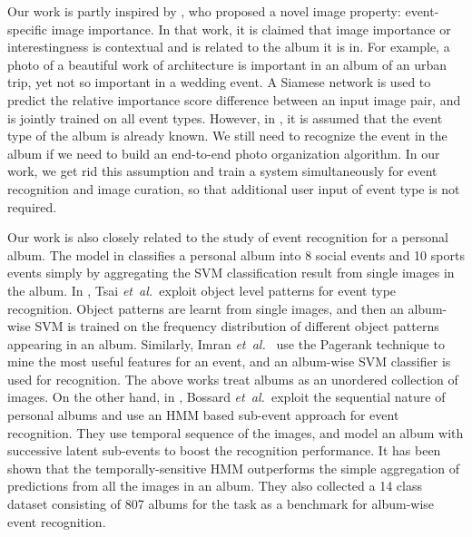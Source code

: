 \documentclass[runningheads]{llncs}
\newcommand{\etal}{\mbox{\emph{et al.\ }}}
\begin{document}
Our work is partly inspired by \cite{CVPR}, who proposed a novel image property: event-specific image importance. In that work, it is claimed that image importance or interestingness is contextual and is related to the album it is in. For example, a photo of a beautiful work of architecture is important in an album of an urban trip, yet not so important in a wedding event.  A Siamese network is used to predict the relative importance score difference between an input image pair, and is 
 jointly trained on all event types.
However, in \cite{CVPR}, it is assumed that the event type of the album is already known. We still need to recognize the event in the album if we need to build an end-to-end photo organization algorithm. In our work, we get rid this assumption and train a system simultaneously for event recognition and image curation, so that additional user input of event type is not required.


Our work is also closely related to the study of event recognition for a personal album. The model in \cite{Mattivi11} classifies a personal album into 8 social events and 10 sports events simply by aggregating the SVM classification result from single images in the album. In \cite{pattern}, Tsai \etal exploit object level patterns for event type recognition. Object patterns are learnt from single images,  and then an album-wise SVM is trained on the frequency distribution of different object patterns appearing in an album. Similarly, Imran \etal \cite{Imran09} use the Pagerank technique to mine the most useful features for an event, and an album-wise SVM classifier is used for recognition.
The above works treat albums as an unordered collection of images. On the other hand, in \cite{HMM}, Bossard \etal exploit the sequential nature of personal albums and use an HMM based sub-event approach for event recognition. They use temporal sequence of the images, and model an album with successive latent sub-events to boost the recognition performance. It has been shown that the temporally-sensitive HMM outperforms the simple aggregation of predictions from all the images in an album.  They also collected a 14 class dataset consisting of 807 albums for the task as a benchmark for album-wise event recognition. 
\end{document}
